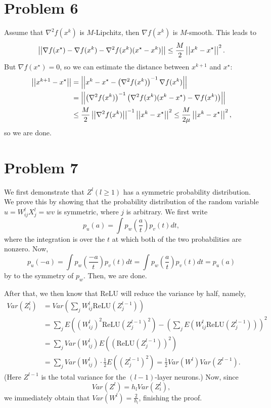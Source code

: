 \documentclass[a4 paper,12pt]{article}
\begin{document}
	\section*{Problem 6}

Assume that $\nabla^2 f(x^k)$ is $M$-Lipchitz, then $\nabla f(x^k)$ is $M$-smooth. This leads to 
\[
\left|\left|\nabla f(x^\star)-\nabla f(x^k)-\nabla^2 f(x^k)(x^\star-x^k)\right|\right|\le \frac{M}{2}\left|\left|x^k-x^\star\right|\right|^2.
\]But $\nabla f(x^\star)=0$, so we can estimate the distance between $x^{k+1}$ and $x^\star$:
\begin{align*}
\left|\left|x^{k+1}-x^\star\right|\right|&=\left|\left|x^{k}-x^\star-\left(\nabla^2 f(x^k)\right)^{-1}\nabla f(x^k)\right|\right|\\
&=\left|\left|\left(\nabla^2 f(x^k)\right)^{-1}\left(\nabla^2 f(x^k)(x^{k}-x^\star)-\nabla f(x^k)\right)\right|\right|\\
&\le \frac{M}{2}\left|\left|\nabla^2 f(x^k)\right|\right|^{-1} \left|\left|x^k-x^\star\right|\right|^2\le \frac{M}{2\mu} \left|\left|x^k-x^\star\right|\right|^2,
\end{align*}so we are done.
\section*{Problem 7}
We first demonstrate that $Z^l(l\ge 1)$ has a symmetric probability distribution. We prove this by showing that the probability distribution of the random variable $u=W_{ij}^lX_j^l=wv$ is symmetric, where $j$ is arbitrary. We first write
\[
p_{u}(a)=\int p_w\left(\frac{a}{t}\right)p_v(t)dt,
\] where the integration is over the $t$ at which both of the two probabilities are nonzero. Now, 
\[
p_{u}(-a)=\int p_w\left(\frac{-a}{t}\right)p_v(t)dt=\int p_w\left(\frac{a}{t}\right)p_v(t)dt=p_u(a)
\] by to the symmetry of $p_w$. Then, we are done. 

After that, we then know that ReLU will reduce the variance by half, namely,
\begin{align*}
Var(Z_i^l)&=Var\left(\sum_{j}W^l_{ij}\text{ReLU}(Z_j^{l-1})\right)\\
&=\sum_{j}E\left((W_{ij}^l)^2\text{ReLU}(Z_j^{l-1})^2\right)-\left(\sum_{j}E(W_{ij}^l\text{ReLU}(Z_j^{l-1}))\right)^2\\
&=\sum_{j}Var(W^l_{ij})E\left((\text{ReLU}(Z_j^{l-1}))^2\right)\\
&=\sum_{j}Var(W^l_{ij})\cdot \frac{1}{2}E((Z_j^{l-1})^2)=\frac{1}{2}Var(W^l)Var(Z^{l-1}).
\end{align*}(Here $Z^{l-1}$ is the total variance for the $(l-1)$-layer neurons.) Now, since 
\[
Var(Z^l)=h_l Var(Z_i^l),
\] we immediately obtain that $Var(W^l)=\frac{2}{h_l}$, finishing the proof.
	
\end{document}
